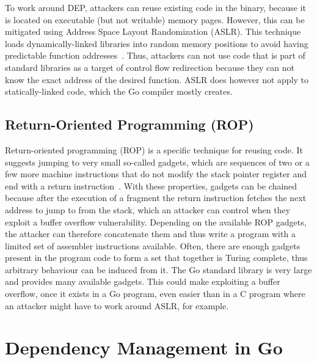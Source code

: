 To work around \acrshort{DEP}, attackers can reuse existing code in the binary, because it is located on executable (but
not writable) memory pages.
However, this can be mitigated using Address Space Layout Randomization (\acrshort{ASLR}).
This technique loads dynamically-linked libraries into random memory positions to avoid having predictable function
addresses~\cite{marco2014}.
Thus, attackers can not use code that is part of standard libraries as a target of control flow redirection because
they can not know the exact address of the desired function.
\acrshort{ASLR} does however not apply to statically-linked code, which the Go compiler mostly creates.



\subsection{Return-Oriented Programming (ROP)}\label{subsec:background:exploit-techniques:rop}

Return-oriented programming (\acrshort{ROP}) is a specific technique for reusing code.
It suggests jumping to very small so-called gadgets, which are sequences of two or a few more machine instructions that
do not modify the stack pointer register and end with a return instruction~\cite{roemer2012}.
With these properties, gadgets can be chained because after the execution of a fragment the return instruction fetches
the next address to jump to from the stack, which an attacker can control when they exploit a buffer overflow
vulnerability.
Depending on the available \acrshort{ROP} gadgets, the attacker can therefore concatenate them and thus write a program
with a limited set of assembler instructions available.
Often, there are enough gadgets present in the program code to form a set that together is Turing complete, thus
arbitrary behaviour can be induced from it.
The Go standard library is very large and provides many available gadgets.
This could make exploiting a buffer overflow, once it exists in a Go program, even easier than in a C program where an
attacker might have to work around \acrshort{ASLR}, for example.



\section{Dependency Management in Go}\label{sec:background:dependencies}


